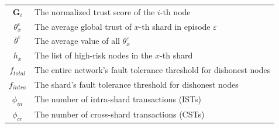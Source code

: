 \begin{table}[t]
\begin{tabular}{c|p{6cm}}
$\mathbf{G}_i$         &The normalized trust score of the $i$-th node
\\
$\theta_{x}^\varepsilon$    &The average global trust of $x$-th shard in episode $\varepsilon$
\\
$\bar \theta^\varepsilon$  &The average value of all $\theta_{x}^\varepsilon$
\\
$h_x$       & The list of high-risk nodes in the $x$-th shard
\\
$f_{total}$     &The entire network's fault tolerance threshold for dishonest nodes
\\
$f_{intra}$     &The shard's fault tolerance threshold for dishonest nodes
\\
$\phi_{in}$   & The number of intra-shard transactions (ISTs)
\\ 
$\phi_{cr}$   & The number of cross-shard transactions (CSTs)
\\ \hline 
    \end{tabular}
\end{table}






